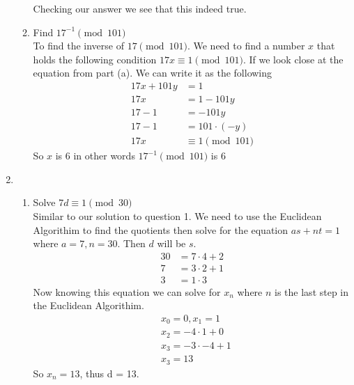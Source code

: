 \documentclass[12pt]{article}
\begin{document}
\begin{enumerate}
\begin{enumerate}
                        Checking our answer we see that this indeed true.
                  \item Find $17^{-1} \pmod{101}$\\
                        To find the inverse of $17 \pmod{101}$. We need to find a number $x$ that holds the following condition $17x \equiv 1 \pmod{101}$. If we look close at the equation from part (a). We can write it as the following\begin{align*}
                              17x +101y & =1                  \\
                              17x       & = 1-101y            \\
                              17-1      & = -101y             \\
                              17 - 1    & = 101\cdot(-y)      \\
                              17x       & \equiv 1 \pmod{101}
                        \end{align*}
                        So $x$ is 6 in other words $17^{-1} \pmod{101}$ is 6
            \end{enumerate}
            \newpage
      \item \begin{enumerate}
                  \item Solve $7d \equiv 1 \pmod{30}$\\
                        Similar to our solution to question 1. We need to use the Euclidean Algorithim to find the quotients then solve for the equation $as+nt =1$ where $a = 7, n=30$. Then $d$ will be $s$.
                        \begin{align*}
                              30 & = 7 \cdot 4 +2 \\
                              7  & = 3 \cdot 2 +1 \\
                              3  & =1 \cdot 3
                        \end{align*}
                        Now knowing this equation we can solve for $x_n$ where $n$ is the last step in the Euclidean Algorithim.
                        \begin{align*}
                               & x_0 = 0, x_1 =1       \\
                               & x_2 = -4 \cdot 1 + 0  \\
                               & x_3 = -3 \cdot -4 + 1 \\
                               & x_3 = 13
                        \end{align*}
                        So $x_n = 13$, thus d = 13.


\end{enumerate}
\end{enumerate}
\end{document}
